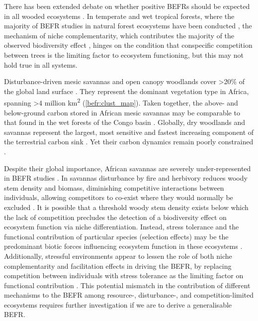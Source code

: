 \begin{refsection}
There has been extended debate on whether positive BEFRs should be expected in all wooded ecosystems \citep{Liang2016}. In temperate and wet tropical forests, where the majority of BEFR studies in natural forest ecosystems have been conducted \citep{Plas2019}, the mechanism of niche complementarity, which contributes the majority of the observed biodiversity effect \citep{Poorter2015, Sande2017a, Wright2017}, hinges on the condition that conspecific competition between trees is the limiting factor to ecosystem functioning, but this may not hold true in all systems. 

Disturbance-driven mesic savannas and open canopy woodlands cover >20\% of the global land surface \citep{Pennington2018, Solbrig1996}. They represent the dominant vegetation type in Africa, spanning >4 million km\textsuperscript{2} \citep{White1987, Ratnam2011, Ryan2016} (\autoref{befr:clust_map}). Taken together, the above- and below-ground carbon stored in African mesic savannas may be comparable to that found in the wet forests of the Congo basin \citep{Houghton2009, Mayaux2008, Spawn2020}. Globally, dry woodlands and savannas represent the largest, most sensitive and fastest increasing component of the terrestrial carbon sink \citep{Ahlstrom2015}. Yet their carbon dynamics remain poorly constrained \citep{Sitch2015}.

Despite their global importance, African savannas are severely under-represented in BEFR studies \citep{Clarke2017, Liang2016}. In savannas disturbance by fire \citep{Lehmann2014} and herbivory \citep{Sankaran2008, Levick2009} reduces woody stem density and biomass, diminishing competitive interactions between individuals, allowing competitors to co-exist where they would normally be excluded \citep{Grime1979, Grace1990}. It is possible that a threshold woody stem density exists below which the lack of competition precludes the detection of a biodiversity effect on ecosystem function via niche differentiation. Instead, stress tolerance and the functional contribution of particular species (selection effects) may be the predominant biotic forces influencing ecosystem function in these ecosystems \citep{Lasky2014, Tobner2016}. Additionally, stressful environments appear to lessen the role of both niche complementarity and facilitation effects in driving the BEFR, by replacing competition between individuals with stress tolerance as the limiting factor on functional contribution \citep{Ratcliffe2017, Paquette2010}. This potential mismatch in the contribution of different mechanisms to the BEFR among resource-, disturbance-, and competition-limited ecosystems requires further investigation if we are to derive a generalisable BEFR.


\end{refsection}
